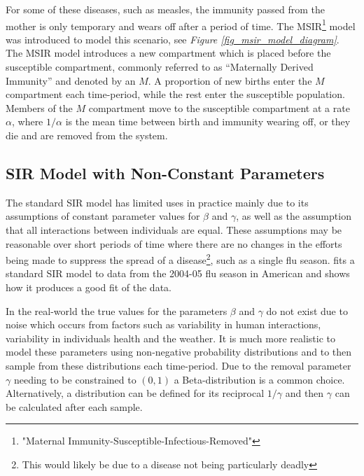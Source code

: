 \documentclass[11pt,a4paper]{article}
\theoremstyle{break}
\begin{document}
  \par For some of these diseases, such as measles, the immunity passed from the mother is only temporary and wears off after a period of time. The MSIR\footnote{"Maternal Immunity-Susceptible-Infectious-Removed"} model \cite[]{mathematics_of_infectious_diseases} was introduced to model this scenario, see \textit{Figure \ref{fig_msir_model_diagram}}. The MSIR model introduces a new compartment which is placed before the susceptible compartment, commonly referred to as ``Maternally Derived Immunity'' and denoted by an $M$. A proportion of new births enter the $M$ compartment each time-period, while the rest enter the susceptible population. Members of the $M$ compartment move to the susceptible compartment at a rate $\alpha$, where $1/\alpha$ is the mean time between birth and immunity wearing off, or they die and are removed from the system.

\subsection*{SIR Model with Non-Constant Parameters}

  \par The standard SIR model has limited uses in practice mainly due to its assumptions of constant parameter values for $\beta$ and $\gamma$, as well as the assumption that all interactions between individuals are equal. These assumptions may be reasonable over short periods of time where there are no changes in the efforts being made to suppress the spread of a disease\footnote{This would likely be due to a disease not being particularly deadly}, such as a single flu season. \cite[]{sir_lecture_slides} fits a standard SIR model to data from the 2004-05 flu season in American and shows how it produces a good fit of the data.

  \par In the real-world the true values for the parameters $\beta$ and $\gamma$ do not exist due to noise which occurs from factors such as variability in human interactions, variability in individuals health and the weather. It is much more realistic to model these parameters using non-negative probability distributions and to then sample from these distributions each time-period. Due to the removal parameter $\gamma$ needing to be constrained to $(0,1)$ a Beta-distribution is a common choice. Alternatively, a distribution can be defined for its reciprocal $1/\gamma$ and then $\gamma$ can be calculated after each sample.
\end{document}
